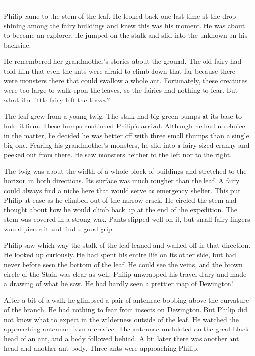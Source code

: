 \documentclass[10pt]{memoir}
\renewcommand{\pfbreakdisplay}{\bigskip \ding{166} \bigskip}
\newcommand{\secbreak}{\fancybreak{\pfbreakdisplay}}
\begin{document}
\secbreak

Philip came to the stem of the leaf. He looked back one last time at the drop
shining among the fairy buildings and knew this was his moment. He was about to
become an explorer. He jumped on the stalk and slid into the unknown on his
backside.

He remembered her grandmother's stories about the ground. The old
fairy had told him that even the ants were afraid to climb down that far
because there were monsters there that could swallow a whole ant. Fortunately,
these creatures were too large to walk upon the leaves, so the fairies had
nothing to fear. But what if a little fairy left the leaves?

The leaf grew from a young twig. The stalk had big green bumps at its base to
hold it firm. These bumps cushioned Philip's arrival. Although he had no choice
in the matter, he decided he was better off with three small thumps than a
single big one. Fearing his grandmother's monsters, he slid into a fairy-sized
cranny and peeked out from there. He saw monsters neither to the left nor to
the right.

The twig was about the width of a whole block of buildings and stretched to the
horizon in both directions. Its surface was much rougher than the leaf. A fairy
could always find a niche here that would serve as emergency shelter. This put
Philip at ease as he climbed out of the narrow crack. He circled the stem and
thought about how he would climb back up at the end of the expedition. The stem
was covered in a strong wax. Pants slipped well on it, but small fairy fingers
would pierce it and find a good grip.

Philip saw which way the stalk of the leaf leaned and walked off in that
direction. He looked up curiously. He had spent his entire life on its other
side, but had never before seen the bottom of the leaf. He could see the veins,
and the brown circle of the Stain was clear as well. Philip unwrapped his
travel diary and made a drawing of what he saw. He had hardly seen a prettier
map of Dewington!

After a bit of a walk he glimpsed a pair of antennae bobbing above the
curvature of the branch. He had nothing to fear from insects on Dewington. But
Philip did not know what to expect in the wilderness outside of the leaf. He
watched the approaching antennae from a crevice. The antennae undulated on the
great black head of an ant, and a body followed behind. A bit later there was
another ant head and another ant body. Three ants were approaching Philip.
\end{document}
